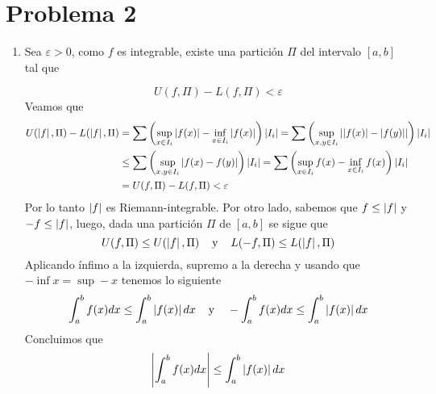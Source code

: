 \documentclass{article}
\begin{document}
\section*{Problema 2}
\begin{enumerate}
    \item Sea $\varepsilon>0$, como $f$ es integrable, existe una partición $\Pi$ del intervalo 
    $[a,b]$ tal que
    
    \begin{equation*}
        U(f,\Pi)-L(f,\Pi)<\varepsilon
    \end{equation*}
    Veamos que
    \begin{align*}
        U(\left|f \right|,\Pi)-L(\left|f \right|,\Pi) &= \sum \left(\sup_{x\in I_{i}}\left|f(x) \right|-
        \inf_{x\in I_{i}}\left|f(x) \right|\right)\left|I_{i} \right|=\sum \left(\sup_{x,y\in I_{i}}
        \left|\left|f(x) \right|-\left|f(y) \right| \right|\right)\left|I_{i} \right|\\
        & \leq\sum \left(\sup_{x,y\in I_{i}}\left|f(x)-f(y) \right|\right)\left|I_{i} \right|
        =\sum \left(\sup_{x\in I_{i}}f(x)-\inf_{x\in I_{i}}f(x)\right)\left|I_{i} \right| \\
        & =U(f,\Pi)-L(f,\Pi)<\varepsilon
    \end{align*}
    Por lo tanto $\left|f \right|$ es Riemann-integrable. Por otro lado, sabemos que $f\leq\left|f \right|$ y 
    $-f\leq\left|f \right|$, luego, dada una partición $\Pi$ de $[a,b]$ se sigue que
    \begin{equation*}
        U(f,\Pi)\leq U(\left|f \right|,\Pi)\hspace{4mm}\text{y}\hspace{4mm}L(-f,\Pi)\leq L(\left|f \right|,\Pi)
    \end{equation*}
    Aplicando ínfimo a la izquierda, supremo a la derecha y usando que $-\inf x=\sup -x$ tenemos 
    lo siguiente
    \begin{equation*}
        \int_{a}^{b}f(x)dx\leq\int_{a}^{b}\left|f(x) \right|dx\hspace{4mm}\text{y}\hspace{4mm}
        -\int_{a}^{b}f(x)dx\leq\int_{a}^{b}\left|f(x) \right|dx
    \end{equation*}
    Concluimos que
    \begin{equation*}
        \left|\int_{a}^{b}f(x)dx \right|\leq\int_{a}^{b}\left|f(x) \right|dx
    \end{equation*}


\end{enumerate}
\end{document}
